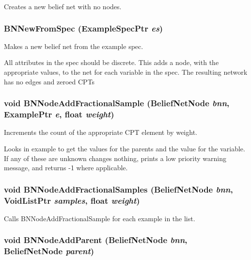 Creates a new belief net with no nodes. 

\subsubsection{ BNNew\-From\-Spec ({\bf Example\-Spec\-Ptr} {\em es})}\label{BeliefNet_8h_a49}


Makes a new belief net from the example spec. 

All attributes in the spec should be discrete. This adds a node, with the appropriate values, to the net for each variable in the spec. The resulting network has no edges and zeroed CPTs 
\subsubsection{\setlength{\rightskip}{0pt plus 5cm}void BNNode\-Add\-Fractional\-Sample ({\bf Belief\-Net\-Node} {\em bnn}, {\bf Example\-Ptr} {\em e}, float {\em weight})}\label{BeliefNet_8h_a32}


Increments the count of the appropriate CPT element by weight. 

Looks in example to get the values for the parents and the value for the variable. If any of these are unknown changes nothing, prints a low priority warning message, and returns -1 where applicable. 
\subsubsection{\setlength{\rightskip}{0pt plus 5cm}void BNNode\-Add\-Fractional\-Samples ({\bf Belief\-Net\-Node} {\em bnn}, {\bf Void\-List\-Ptr} {\em samples}, float {\em weight})}\label{BeliefNet_8h_a33}


Calls BNNode\-Add\-Fractional\-Sample for each example in the list. 

\subsubsection{\setlength{\rightskip}{0pt plus 5cm}void BNNode\-Add\-Parent ({\bf Belief\-Net\-Node} {\em bnn}, {\bf Belief\-Net\-Node} {\em parent})}\label{BeliefNet_8h_a9}


